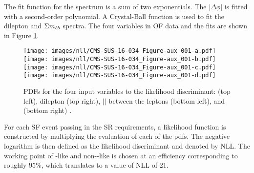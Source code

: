 The fit function for the \ptmiss spectrum is a sum of two exponentials. The $|\Delta\phi|$ is fitted with a second-order polynomial.
A Crystal-Ball function is used to fit the dilepton \pt and $\Sigma m_{\ell b}$ spectra.
The four variables in OF data and the fits are shown in Figure \ref{fig:pdfsNLL}.
\begin{figure}[htbp!] 
\begin{center}
    \texttt{[image: images/nll/CMS-SUS-16-034\_Figure-aux\_001-a.pdf]}
    \texttt{[image: images/nll/CMS-SUS-16-034\_Figure-aux\_001-b.pdf]} \\
    \texttt{[image: images/nll/CMS-SUS-16-034\_Figure-aux\_001-c.pdf]} 
    \texttt{[image: images/nll/CMS-SUS-16-034\_Figure-aux\_001-d.pdf]}
    \caption{PDFs for the four input variables to the likelihood discriminant: \ptmiss (top left), dilepton \pt (top right),
    $|$\dphi$|$ between the leptons (bottom left), and \mlb (bottom right) \cite{CMS-PAS-SUS-16-034}.}
\label{fig:pdfsNLL}
\end{center}
\end{figure}
For each SF event passing in the SR requirements, a likelihood function is constructed by multiplying the evaluation of each of the pdfs.
The negative logarithm is then defined as the likelihood discriminant and denoted by NLL.
The working point of \ttbar-like and non-\ttbar-like is chosen at an efficiency corresponding to roughly 95\%, which translates to a value of NLL of 21.
